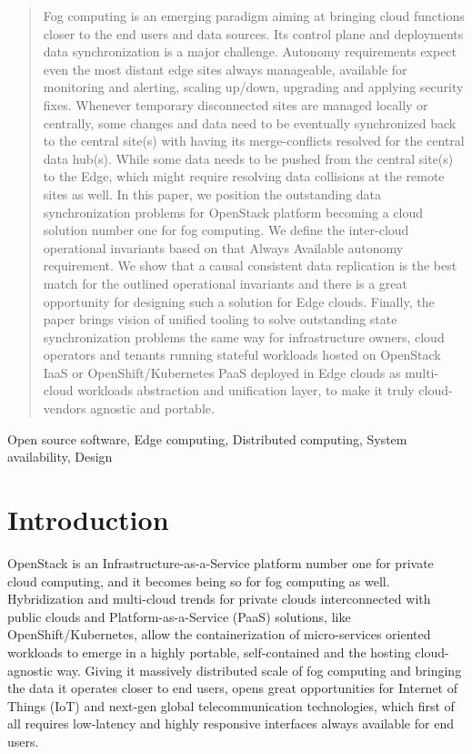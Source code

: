 \documentclass[conference]{IEEEtran}
\begin{document}
\begin{abstract}
Fog computing is an emerging paradigm aiming at bringing cloud functions closer
to the end users and data sources. Its control plane and deployments data
synchronization is a major challenge. Autonomy requirements expect even the
most distant edge sites always manageable, available for monitoring and
alerting, scaling up/down, upgrading and applying security fixes. Whenever
temporary disconnected sites are managed locally or centrally, some changes
and data need to be eventually synchronized back to the central site(s) with
having its merge-conflicts resolved for the central data hub(s). While some
data needs to be pushed from the central site(s) to the Edge, which might
require resolving data collisions at the remote sites as well. In this paper,
we position the outstanding data synchronization problems for OpenStack
platform becoming a cloud solution number one for fog computing. We define
the inter-cloud operational invariants based on that Always Available
autonomy requirement.  We show that a causal consistent data replication is
the best match for the outlined operational invariants and there is a great
opportunity for designing such a solution for Edge clouds. Finally, the paper
brings vision of unified tooling to solve outstanding state synchronization
problems the same way for infrastructure owners, cloud operators and tenants
running stateful workloads hosted on OpenStack IaaS or OpenShift/Kubernetes
PaaS deployed in Edge clouds as multi-cloud workloads abstraction and
unification layer, to make it truly cloud-vendors agnostic and portable.
\end{abstract}

\begin{IEEEkeywords}
Open source software, Edge computing, Distributed computing, System
availability, Design
\end{IEEEkeywords}

\section{Introduction}

OpenStack is an Infrastructure-as-a-Service platform number one for private
cloud computing, and it becomes being so for fog computing as well.
Hybridization and multi-cloud trends for private clouds interconnected with
public clouds and Platform-as-a-Service (PaaS) solutions, like
OpenShift/Kubernetes, allow the containerization of micro-services oriented
workloads to emerge in a highly portable, self-contained and the hosting
cloud-agnostic way. Giving it massively distributed scale of fog computing and
bringing the data it operates closer to end users, opens great opportunities
for Internet of Things (IoT) and next-gen global telecommunication technologies,
which first of all requires low-latency and highly responsive interfaces always
available for end users.
\end{document}
